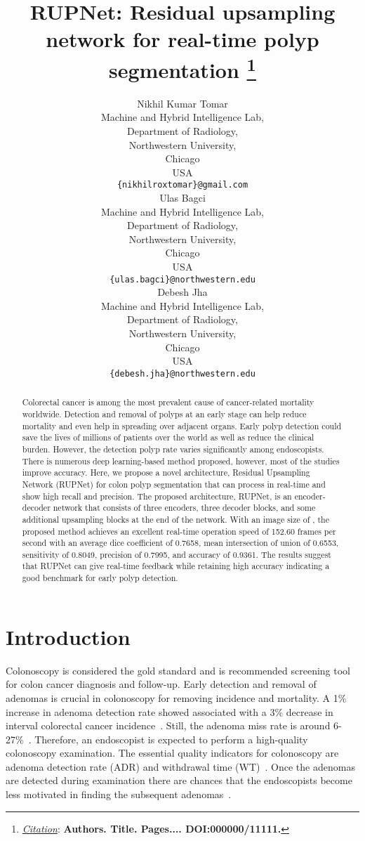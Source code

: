 \documentclass{article}
\title{RUPNet: Residual upsampling network for real-time polyp segmentation
\thanks{\textit{\underline{Citation}}: 
\textbf{Authors. Title. Pages.... DOI:000000/11111.}} 
}
\author{
 Nikhil Kumar Tomar\\
 Machine and Hybrid Intelligence Lab,\\ Department of Radiology,\\ Northwestern University, \\Chicago \\
  USA\\
  \texttt{\{nikhilroxtomar\}@gmail.com} \\
\And
  Ulas Bagci \\
  Machine and Hybrid Intelligence Lab,\\ Department of Radiology,\\ Northwestern University, \\Chicago \\
  USA\\
  \texttt{\{ulas.bagci\}@northwestern.edu} \\
     \And
Debesh Jha \\
  Machine and Hybrid Intelligence Lab,\\ Department of Radiology,\\ Northwestern University, \\Chicago \\
  USA\\
  \texttt{\{debesh.jha\}@northwestern.edu} \\
}
\begin{document}
\maketitle


\begin{abstract}
Colorectal cancer is among the most prevalent cause of cancer-related mortality worldwide. Detection and removal of polyps at an early stage can help reduce mortality and even help in spreading over adjacent organs. Early polyp detection could save the lives of millions of patients over the world as well as reduce the clinical burden. However, the detection polyp rate varies significantly among endoscopists. There is numerous deep learning-based method proposed, however, most of the studies improve accuracy. Here, we propose a novel architecture,  Residual Upsampling Network (RUPNet) for colon polyp segmentation that can process in real-time and show high recall and precision. The proposed architecture, RUPNet, is an encoder-decoder network that consists of three encoders, three decoder blocks, and some additional upsampling blocks at the end of the network. With an image size of , the proposed method achieves an excellent real-time operation speed of 152.60 frames per second with an average dice coefficient of 0.7658,  mean intersection of union of 0.6553, sensitivity of 0.8049, precision of 0.7995, and accuracy of 0.9361. The results suggest that RUPNet can give real-time feedback while retaining high accuracy indicating a good benchmark for early polyp detection.
\end{abstract}




\section{Introduction}
Colonoscopy is considered the gold standard and is recommended screening tool for colon cancer diagnosis and follow-up. Early detection and removal of adenomas is crucial in colonoscopy for removing incidence and mortality. A 1\% increase in adenoma detection rate showed associated with a 3\% decrease in interval colorectal cancer incidence~\cite{urban2018deep}. Still, the adenoma miss rate is around 6-27\%~\cite{ahn2012miss}. Therefore, an endoscopist is expected to perform a high-quality colonoscopy examination. The essential quality indicators for colonoscopy are adenoma detection rate (ADR) and withdrawal time (WT)~\cite{rex2002quality,kaminski2010quality}. Once the adenomas are detected during examination there are chances that the endoscopists become less motivated in finding the subsequent adenomas~\cite{lai2009boston,imperiale2016new,amano2018number}.
\end{document}
